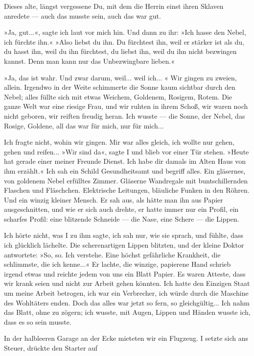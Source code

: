 Dieses alte, längst vergessene Du, mit dem die Herrin einst ihren
Sklaven anredete — auch das musste sein, auch das war gut.

»Ja, gut...«, sagte ich laut vor mich hin. Und dann zu ihr: »Ich
hasse den Nebel, ich fürchte ihn.« »Also liebst du ihn. Du
fürchtest ihn, weil er stärker ist als du, du hasst ihn, weil du
ihn fürchtest, du liebst ihn, weil du ihn nicht bezwingen kannst.
Denn man kann nur das Unbezwingbare lieben.«

»Ja, das ist wahr. Und zwar darum, weil... weil ich... « Wir gingen
zu zweien, allein. Irgendwo in der Weite schimmerte die Sonne kaum
sichtbar durch den Nebel; alles füllte sich mit etwas Weichem,
Goldenem, Rosigem, Rotem. Die ganze Welt war eine riesige Frau, und
wir ruhten in ihrem Schoß, wir waren noch nicht geboren, wir
reiften freudig heran. Ich wusste — die Sonne, der Nebel, das
Rosige, Goldene, all das war für mich, nur für mich...

Ich fragte nicht, wohin wir gingen. Mir war alles gleich, ich
wollte nur gehen, gehen und reifen... »Wir sind da«, sagte I und
blieb vor einer Tür stehen. »Heute hat gerade einer meiner Freunde
Dienst. Ich habe dir damals im Alten Haus von ihm erzählt.« Ich sah
ein Schild Gesundheitsamt und begriff alles. Ein gläsernes, von
goldenem Nebel erfülltes Zimmer. Gläserne Wandregale mit
buntschillernden Flaschen und Fläschchen. Elektrische Leitungen,
bläuliche Funken in den Röhren. Und ein winzig kleiner Mensch. Er
sah aus, als hätte man ihn aus Papier ausgeschnitten, und wie er
sich auch drehte, er hatte immer nur ein Profil, ein scharfes
Profil: eine blitzende Schneide — die Nase, eine Schere — die
Lippen.

Ich hörte nicht, was I zu ihm sagte, ich sah nur, wie sie sprach,
und fühlte, dass ich glücklich lächelte. Die scherenartigen Lippen
blitzten, und der kleine Doktor antwortete: »So, so. Ich verstehe.
Eine höchst gefährliche Krankheit, die schlimmste, die ich
kenne...« Er lachte, die winzige, papierene Hand schrieb irgend
etwas und reichte jedem von uns ein Blatt Papier. Es waren Atteste,
dass wir krank seien und nicht zur Arbeit gehen könnten. Ich hatte
den Einzigen Staat um meine Arbeit betrogen, ich war ein
Verbrecher, ich würde durch die Maschine des Wohltäters enden. Doch
das alles war jetzt so fern, so gleichgültig... Ich nahm das Blatt,
ohne zu zögern; ich wusste, mit Augen, Lippen und Händen wusste
ich, dass es so sein musste.

In der halbleeren Garage an der Ecke mieteten wir ein Flugzeug. I
setzte sich ans Steuer, drückte den Starter auf

